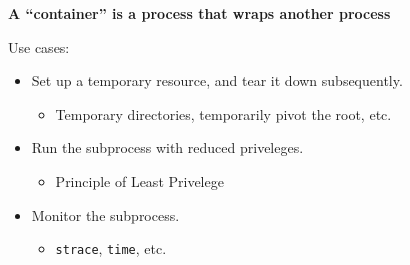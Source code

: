 \begin{frame}

\begin{center}

\large \textbf{A ``container'' is a process that wraps another process}

\end{center}

\pause

\vspace{\fill}

Use cases:

\begin{itemize}

\item Set up a temporary resource, and tear it down subsequently.

\begin{itemize}

\item Temporary directories, temporarily pivot the root, etc.

\end{itemize}

\item Run the subprocess with reduced priveleges.

\begin{itemize}

\item Principle of Least Privelege

\end{itemize}

\item Monitor the subprocess.

\begin{itemize}

\item \texttt{strace}, \texttt{time}, etc.

\end{itemize}

\end{itemize}

\end{frame}


